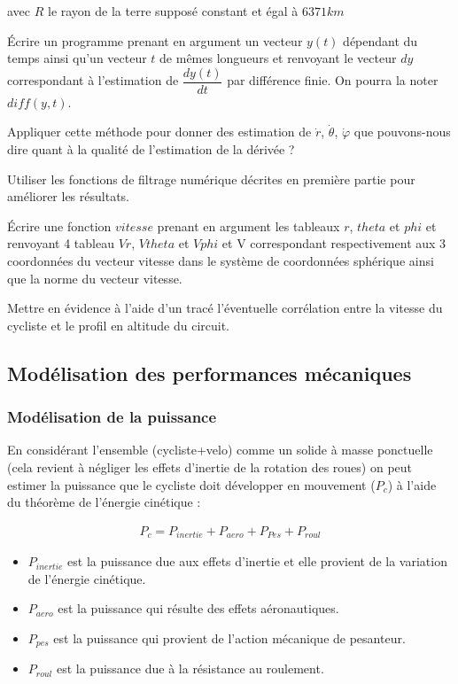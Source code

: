 avec $R$ le rayon de la terre supposé constant et égal à $6 371km$

\question{} Écrire un programme prenant en argument un vecteur $y(t)$ dépendant du temps ainsi qu'un vecteur $t$ de mêmes longueurs et renvoyant le vecteur $dy$ correspondant à l'estimation de $\dfrac{dy(t)}{dt}$ par différence finie. On pourra la noter $diff(y,t)$.

\question{} Appliquer cette méthode pour donner des estimation de $\dot{r}$, $\dot{\theta}$, $\dot{\varphi}$ que pouvons-nous dire quant à la qualité de l'estimation de la dérivée ?

\question{} Utiliser les fonctions de filtrage numérique décrites en première partie pour améliorer les résultats.

\question{} Écrire une fonction $vitesse$ prenant en argument les tableaux $r$, $theta$ et $phi$ et renvoyant 4 tableau $Vr$, $Vtheta$ et $Vphi$ et V correspondant respectivement aux 3 coordonnées du vecteur vitesse dans le système de coordonnées sphérique ainsi que la norme du vecteur vitesse.

\question{} Mettre en évidence à l'aide d'un tracé l'éventuelle corrélation entre la vitesse du cycliste et le profil en altitude du circuit.



\subsection*{Modélisation des performances mécaniques}
\subsubsection*{Modélisation de la puissance}

En considérant l'ensemble (cycliste+velo) comme un solide à masse ponctuelle (cela revient à négliger les effets d'inertie de la rotation des roues) on peut estimer la puissance que le cycliste doit développer en mouvement ($P_c$) à l'aide du théorème de l'énergie cinétique : 

\begin{align*}
P_c=P_{inertie}+P_{aero}+P_{Pes}+P_{roul}
\end{align*}

\begin{itemize}
\item $P_{inertie}$ est la puissance due aux effets d'inertie et elle provient de la variation de l'énergie cinétique. 
\item $P_{aero}$ est la puissance qui résulte des effets aéronautiques.
\item $P_{pes}$ est la puissance qui provient de l'action mécanique de pesanteur.
\item $P_{roul}$ est la puissance due à la résistance au roulement.
\end{itemize}

